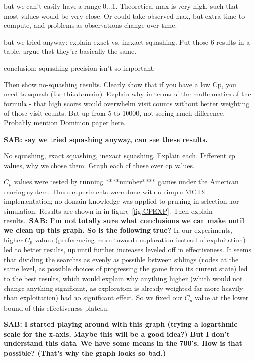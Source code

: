 \documentclass[letterpaper]{article}
\begin{document}
but we can't easily have a range 0...1. Theoretical max is very high, such that most values would be very close. Or could take observed max, but extra time to compute, and problems as observations change over time.

but we tried anyway: explain exact vs. inexact squashing. Put those 6 results in a table, argue that they're basically the same.

conclusion: squashing precision isn't so important.

Then show no-squashing results. Clearly show that if you have a low Cp, you need to squash (for this domain). Explain why in terms of the mathematics of the formula - that high scores would overwhelm visit counts without better weighting of those visit counts. But up from 5 to 10000, not seeing much difference. Probably mention Dominion paper here.

{\bf SAB: say we tried squashing anyway, can see these results.}

No squashing, exact squashing, inexact squashing. Explain each.
Different cp values, why we chose them.
Graph each of these over cp values.

$C_p$ values were tested by running ****number**** games under the American scoring system. These experiments were done with a simple MCTS implementation; no domain knowledge was applied to pruning in selection nor simulation. Results are shown in in figure~\ref{fig:CPEXP}. Then explain results...{\bf SAB: I'm not totally sure what conclusions we can make until we clean up this graph. So is the following true?} In our experiments, higher $C_p$ values (preferencing more towards exploration instead of exploitation) led to better results, up until further increases leveled off in effectiveness. It seems that dividing the searches as evenly as possible between siblings (nodes at the same level, as possible choices of progressing the game from its current state) led to the best results, which would explain why anything higher (which would not change anything significant, as exploration is already weighted far more heavily than exploitation) had no significant effect. So we fixed our $C_p$ value at the lower bound of this effectiveness plateau.

{\bf SAB: I started playing around with this graph (trying a logarthmic scale for the x-axis. Maybe this will be a good idea?) But I don't understand this data. We have some means in the 700's. How is that possible? (That's why the graph looks so bad.)}
\end{document}
